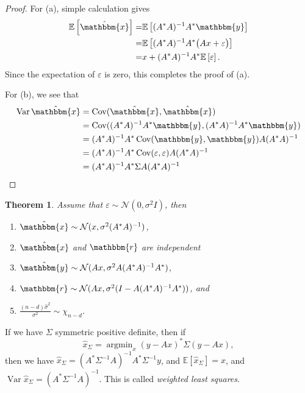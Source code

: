 \documentclass[12pt]{article}
\newtheorem{theorem}{Theorem}[section]
\theoremstyle{definition}
\DeclareMathOperator{\argmin}{argmin}
\DeclareMathOperator{\var}{Var}
\DeclareMathOperator{\cov}{Cov}
\newcommand{\E}[1]{\mathbb{E} \left[#1\right]}
\begin{document}
\begin{proof}
    For (a), simple calculation gives
    \begin{equation*}
        \begin{aligned}
            \E{\hat{\mathbbm{x}}} =& \E{(A^*A)^{-1}A^* \mathbbm{y}}\\
            =& \E{(A^*A)^{-1}A^* \big( Ax + \varepsilon\big)}\\
            =& x + (A^*A)^{-1}A^*  \E{\varepsilon}.
        \end{aligned}
    \end{equation*}
    Since the expectation of $\varepsilon$ is zero, this completes the proof of (a).

    For (b), we see that 
    \begin{equation*}
        \begin{aligned}
            \var \hat{\mathbbm{x}} &= \cov (\hat{\mathbbm{x}},\hat{\mathbbm{x}})\\
            &= \cov((A^*A)^{-1}A^* \mathbbm{y}, (A^*A)^{-1}A^* \mathbbm{y})\\
            &= (A^*A)^{-1}A^*\cov( \mathbbm{y}, \mathbbm{y})A(A^*A)^{-1}\\
            &= (A^*A)^{-1}A^*\cov( \varepsilon, \varepsilon)A(A^*A)^{-1}\\
            &= (A^*A)^{-1}A^*\Sigma A(A^*A)^{-1}
        \end{aligned}
    \end{equation*}
\end{proof}

\begin{theorem}
    Assume that $\varepsilon \sim \mathcal{N}(0,\sigma^2 I)$, then
    \begin{enumerate}[label=(\alph*)]
        \item $\hat{\mathbbm{x}} \sim \mathcal{N}(x,\sigma^2 (A^*A)^{-1})$, 
        \item $\hat{\mathbbm{x}}$ and ${\mathbbm{r}}$ are independent
        \item $\hat{\mathbbm{y}} \sim \mathcal{N}(Ax,\sigma^2 A(A^*A)^{-1}A^*)$, 
        \item ${\mathbbm{r}} \sim \mathcal{N}(Ax,\sigma^2 (I-A(A^*A)^{-1}A^*))$, and
        \item $\frac{(n-d)\hat{\sigma}^2}{\sigma^2} \sim \chi_{n-d}$.
    \end{enumerate}
\end{theorem}

If we have $\Sigma$ symmetric positive definite, then if 
\begin{equation*}
    \hat{x}_\Sigma = \argmin_x (y-Ax)^*\Sigma(y-Ax),
\end{equation*}
then we have $\hat{x}_\Sigma = (A^*\Sigma^{-1}A)^{-1}A^*\Sigma^{-1} y$, and $\E{\hat{x}_\Sigma} = x$, and $\var \hat{x}_\Sigma = (A^*\Sigma^{-1}A)^{-1}$. This is called \textit{weighted least squares}. 
\end{document}
